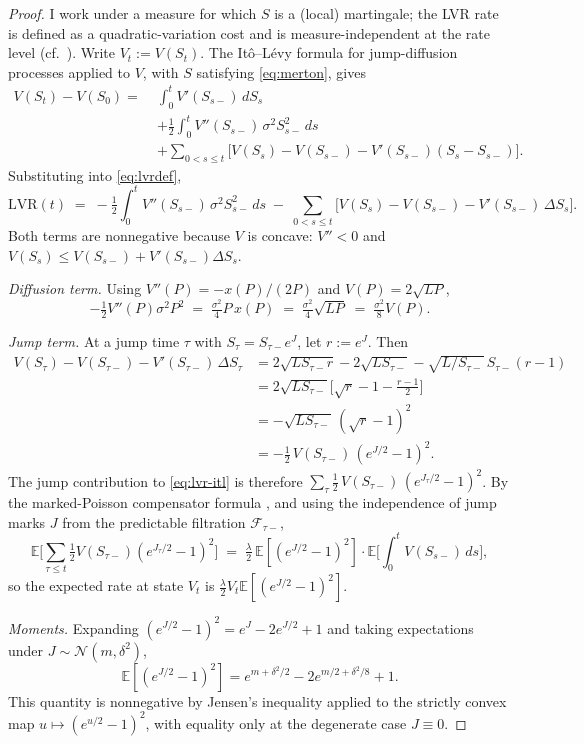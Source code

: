 \documentclass[runningheads]{llncs}
\newcommand{\E}{\mathbb{E}}
\newcommand{\1}{\mathbf{1}}
\begin{document}
\begin{proof}
I work under a measure for which $S$ is a (local) martingale; the LVR rate is defined as a quadratic-variation cost and is measure-independent at the rate level (cf.~\cite{milionis2022automated}). Write $V_t := V(S_t)$. The It\^o--L\'evy formula for jump-diffusion processes \cite[Prop.~8.14]{cont2003financial} applied to $V$, with $S$ satisfying \eqref{eq:merton}, gives
\begin{align*}
V(S_t) - V(S_0) =\;& \int_0^t V'(S_{s-})\,dS_s \\
&+ \tfrac{1}{2}\int_0^t V''(S_{s-})\,\sigma^2 S_{s-}^2 \,ds \\
&+ \sum_{0 < s \leq t} \!\Big[V(S_s) - V(S_{s-}) - V'(S_{s-})(S_s - S_{s-})\Big].
\end{align*}
Substituting into \eqref{eq:lvrdef},
\begin{equation}\label{eq:lvr-itl}
\mathrm{LVR}(t) \;=\; -\tfrac{1}{2}\int_0^t V''(S_{s-})\,\sigma^2 S_{s-}^2 \, ds \;-\; \sum_{0 < s \leq t}\!\Big[V(S_s) - V(S_{s-}) - V'(S_{s-})\,\Delta S_s\Big].
\end{equation}
Both terms are nonnegative because $V$ is concave: $V''<0$ and $V(S_s) \leq V(S_{s-}) + V'(S_{s-})\Delta S_s$.

\emph{Diffusion term.} Using $V''(P) = -x(P)/(2P)$ and $V(P) = 2\sqrt{LP}$,
\[
-\tfrac{1}{2} V''(P) \sigma^2 P^2 \;=\; \tfrac{\sigma^2}{4} P\,x(P) \;=\; \tfrac{\sigma^2}{4} \sqrt{L P} \;=\; \tfrac{\sigma^2}{8} V(P).
\]

\emph{Jump term.} At a jump time $\tau$ with $S_\tau = S_{\tau-} e^{J}$, let $r := e^J$. Then
\begin{align*}
V(S_\tau) - V(S_{\tau-}) - V'(S_{\tau-})\,\Delta S_\tau
&= 2\sqrt{L S_{\tau-} r} - 2\sqrt{L S_{\tau-}} - \sqrt{L/S_{\tau-}}\,S_{\tau-}(r-1) \\
&= 2\sqrt{L S_{\tau-}}\Big[\sqrt{r} - 1 - \tfrac{r-1}{2}\Big] \\
&= -\sqrt{L S_{\tau-}}\,(\sqrt{r}-1)^2 \\
&= -\tfrac{1}{2}\,V(S_{\tau-})\,(e^{J/2} - 1)^2.
\end{align*}
The jump contribution to \eqref{eq:lvr-itl} is therefore $\sum_{\tau} \tfrac{1}{2}\,V(S_{\tau-})\,(e^{J_\tau/2} - 1)^2$. By the marked-Poisson compensator formula \cite[Prop.~8.8]{cont2003financial}, and using the independence of jump marks $J$ from the predictable filtration $\mathcal{F}_{\tau-}$,
\[
\E\!\Big[\sum_{\tau \leq t} \tfrac{1}{2}V(S_{\tau-})(e^{J_\tau/2}-1)^2\Big] \;=\; \tfrac{\lambda}{2}\,\E[(e^{J/2}-1)^2]\cdot\E\!\Big[\int_0^t V(S_{s-})\,ds\Big],
\]
so the expected rate at state $V_t$ is $\tfrac{\lambda}{2} V_t \E[(e^{J/2}-1)^2]$.

\emph{Moments.} Expanding $(e^{J/2}-1)^2 = e^{J} - 2 e^{J/2} + 1$ and taking expectations under $J \sim \mathcal{N}(m,\delta^2)$,
\[
\E[(e^{J/2}-1)^2] = e^{m+\delta^2/2} - 2 e^{m/2 + \delta^2/8} + 1.
\]
This quantity is nonnegative by Jensen's inequality applied to the strictly convex map $u \mapsto (e^{u/2}-1)^2$, with equality only at the degenerate case $J\equiv 0$.
\end{proof}
\end{document}
